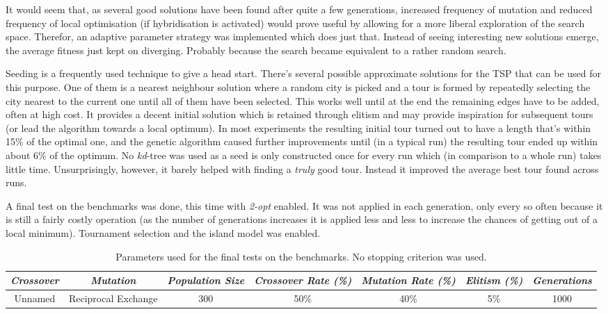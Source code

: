 
It would seem that, as several good solutions have been found after quite a few generations, increased frequency of mutation and reduced frequency of local optimisation (if hybridisation is activated) would prove useful by allowing for a more liberal exploration of the search space. Therefor, an adaptive parameter strategy was implemented which does just that. Instead of seeing interesting new solutions emerge, the average fitness just kept on diverging. Probably because the search became equivalent to a rather random search.


Seeding is a frequently used technique to give a head start. There's several possible approximate solutions for the TSP that can be used for this purpose. One of them is a nearest neighbour solution where a random city is picked and a tour is formed by repeatedly selecting the city nearest to the current one until all of them have been selected. This works well until at the end the remaining edges have to be added, often at high cost. It provides a decent initial solution which is retained through elitism and may provide inspiration for subsequent tours (or lead the algorithm towards a local optimum). In most experiments the resulting initial tour turned out to have a length that's within 15\% of the optimal one, and the genetic algorithm caused further improvements until (in a typical run) the resulting tour ended up within about 6\% of the optimum. No \textit{kd}-tree was used as a seed is only constructed once for every run which (in comparison to a whole run) takes little time. Unsurprisingly, however, it barely helped with finding a \textit{truly} good tour. Instead it improved the average best tour found across runs.


A final test on the benchmarks was done, this time with \textit{2-opt} enabled. It was not applied in each generation, only every so often because it is still a fairly costly operation (as the number of generations increases it is applied less and less to increase the chances of getting out of a local minimum). Tournament selection and the island model was enabled.

\begin{table}[h]
\centering
\footnotesize
\begin{tabular}{c|c|c|c|c|c|c}
\textit{Crossover} & \textit{Mutation} & \textit{Population Size} & \textit{Crossover Rate (\%)} & \textit{Mutation Rate (\%)} & \textit{Elitism (\%)} & \textit{Generations} \\\hline 
Unnamed & Reciprocal Exchange & 300 & 50\% & 40\% & 5\% & 1000
\end{tabular}
\caption{Parameters used for the final tests on the benchmarks. No stopping criterion was used.}
\label{tab:par2}
\end{table}

